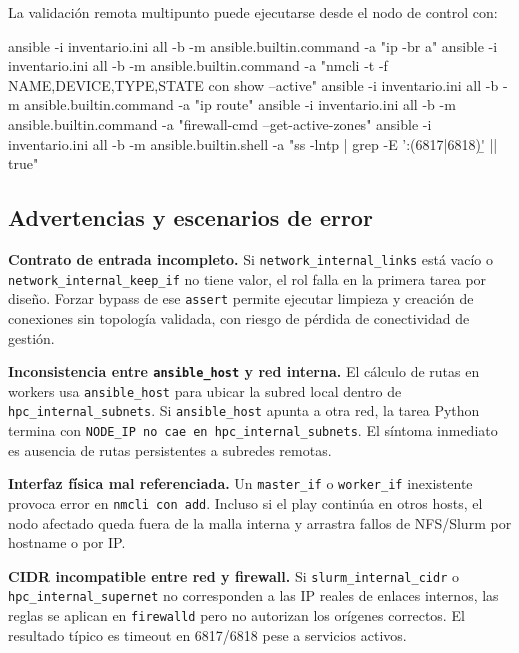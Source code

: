 La validación remota multipunto puede ejecutarse desde el nodo de control con:

\begin{terminalblock}
ansible -i inventario.ini all -b -m ansible.builtin.command -a "ip -br a"
ansible -i inventario.ini all -b -m ansible.builtin.command -a "nmcli -t -f NAME,DEVICE,TYPE,STATE con show --active"
ansible -i inventario.ini all -b -m ansible.builtin.command -a "ip route"
ansible -i inventario.ini all -b -m ansible.builtin.command -a "firewall-cmd --get-active-zones"
ansible -i inventario.ini all -b -m ansible.builtin.shell -a "ss -lntp | grep -E ':(6817|6818)\b' || true"
\end{terminalblock}

\subsection{Advertencias y escenarios de error}
\begin{criticalnote}
\textbf{Contrato de entrada incompleto.} Si \texttt{network\_internal\_links} está vacío o \texttt{network\_internal\_keep\_if} no tiene valor, el rol falla en la primera tarea por diseño. Forzar bypass de ese \texttt{assert} permite ejecutar limpieza y creación de conexiones sin topología validada, con riesgo de pérdida de conectividad de gestión.
\end{criticalnote}

\begin{criticalnote}
\textbf{Inconsistencia entre \texttt{ansible\_host} y red interna.} El cálculo de rutas en workers usa \texttt{ansible\_host} para ubicar la subred local dentro de \texttt{hpc\_internal\_subnets}. Si \texttt{ansible\_host} apunta a otra red, la tarea Python termina con \texttt{NODE\_IP no cae en hpc\_internal\_subnets}. El síntoma inmediato es ausencia de rutas persistentes a subredes remotas.
\end{criticalnote}

\begin{criticalnote}
\textbf{Interfaz física mal referenciada.} Un \texttt{master\_if} o \texttt{worker\_if} inexistente provoca error en \texttt{nmcli con add}. Incluso si el play continúa en otros hosts, el nodo afectado queda fuera de la malla interna y arrastra fallos de NFS/Slurm por hostname o por IP.
\end{criticalnote}

\begin{criticalnote}
\textbf{CIDR incompatible entre red y firewall.} Si \texttt{slurm\_internal\_cidr} o \texttt{hpc\_internal\_supernet} no corresponden a las IP reales de enlaces internos, las reglas se aplican en \texttt{firewalld} pero no autorizan los orígenes correctos. El resultado típico es timeout en 6817/6818 pese a servicios activos.
\end{criticalnote}

